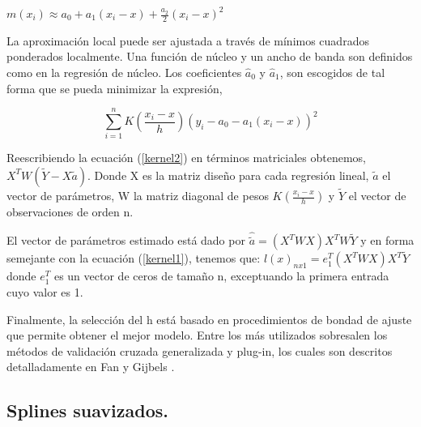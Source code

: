 \begin{center}
$\displaystyle{m(x_{i}) \approx  a_{0} + a_{1}(x_{i}-x) + \frac{a_{2}}{2}(x_{i}-x)^2}$
\end{center}

\vspace*{0.2 cm}

\hspace*{0.4 cm} La aproximaci\'on local puede ser ajustada a trav\'es de m\'inimos cuadrados ponderados localmente. Una funci\'on de n\'ucleo y un ancho de banda son definidos como en la regresi\'on de n\'ucleo. Los coeficientes $\hat{a}_{0}$ y $\hat{a}_{1}$, son escogidos de tal forma que se pueda minimizar la expresi\'on,

\vspace*{0.2 cm}

\begin{equation}
 \sum_{i=1}^{n} K(\frac{x_{i}-x}{h}) (y_{i}-a_{0}-a_{1}(x_{i}-x))^2 
 \label{kernel2}
\end{equation}

\vspace*{0.2 cm}


\hspace*{0.4 cm} Reescribiendo la ecuaci\'on (\ref{kernel2}) en t\'erminos matriciales obtenemos, $X^{T}W(\tilde{Y}-X \tilde{a})$. Donde X es la matriz dise\~no para cada regresi\'on lineal, $\tilde{a}$ el vector de
par\'ametros, W la matriz diagonal de pesos $K(\frac{x_{i}-x}{h})$ y $\tilde{Y}$ el vector de observaciones de orden n.


\hspace*{0.4 cm} El vector de par\'ametros estimado est\'a dado por $ \hat{\tilde{a}} = (X^{T}WX)X^{T}W \tilde{Y} $
y en forma semejante con la ecuaci\'on (\ref{kernel1}), tenemos que: $l(x)_{nx1} = e_{1}^{T} (X^{T}WX)X^{T} \tilde{Y}$ donde $e_{1}^{T}$
es un vector de ceros de tama\~no n, exceptuando la primera entrada cuyo valor es 1.

\hspace*{0.4 cm}Finalmente, la selecci\'on del h est\'a basado en procedimientos de bondad de ajuste que permite obtener el mejor modelo. Entre los m\'as utilizados sobresalen los m\'etodos de validaci\'on cruzada generalizada y plug-in, los cuales son descritos detalladamente en Fan y Gijbels \cite{FG}.

\subsection{Splines suavizados.\\}

